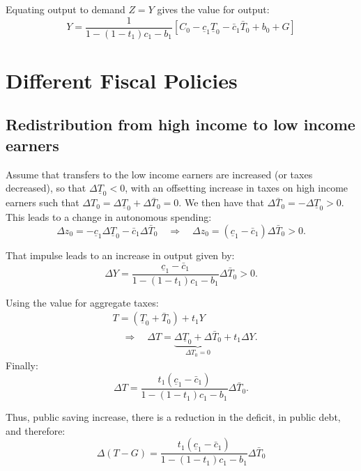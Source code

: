 \documentclass[]{book}
\theoremstyle{definition}
\theoremstyle{definition}
\theoremstyle{definition}
\theoremstyle{remark}
\begin{document}
Equating output to demand \(Z = Y\) gives the value for output:
\[\boxed{Y=\frac{1}{1-\left(1-t_{1}\right)c_{1}-b_{1}}\left[C_0-\underline{c}_{1}\underline{T}_{0}-\bar{c}_{1}\bar{T}_{0}+b_{0}+G\right]}\]

\section{Different Fiscal Policies}\label{different-fiscal-policies}

\subsection{Redistribution from high income to low income
earners}\label{redistribution-from-high-income-to-low-income-earners}

Assume that transfers to the low income earners are increased (or taxes
decreased), so that \(\Delta\underline{T}_{0}<0\), with an offsetting
increase in taxes on high income earners such that
\(\Delta T_0 = \Delta\underline{T}_{0}+\Delta\bar{T}_{0}=0\). We then
have that \(\Delta\bar{T}_{0}=-\Delta\underline{T}_{0}>0\). This leads
to a change in autonomous spending:
\[\Delta z_{0}=-\underline{c}_{1}\Delta\underline{T}_{0}-\bar{c}_{1}\Delta\bar{T}_{0}\quad\Rightarrow\quad\Delta z_{0}=\left(\underline{c}_{1}-\bar{c}_{1}\right)\Delta\bar{T}_{0}>0.\]

That impulse leads to an increase in output given by:
\[\Delta Y=\frac{\underline{c}_{1}-\bar{c}_{1}}{1-\left(1-t_{1}\right)c_{1}-b_{1}}\Delta\bar{T}_{0}>0.\]

Using the value for aggregate taxes: \[
\begin{aligned}
&T=\left(\underline{T}_{0}+\bar{T}_{0}\right)+t_1 Y\\
&\quad \Rightarrow \quad \Delta T=\underbrace{\Delta\underline{T}_{0}+\Delta\bar{T}_{0}}_{\Delta T_0 = 0}+t_1\Delta Y.
\end{aligned}
\] Finally:
\[\Delta T=\frac{t_1\left(\underline{c}_{1}-\bar{c}_{1}\right)}{1-\left(1-t_{1}\right)c_{1}-b_{1}}\Delta\bar{T}_{0}.\]

Thus, public saving increase, there is a reduction in the deficit, in
public debt, and therefore:
\[\Delta\left(T-G\right)=\frac{t_1\left(\underline{c}_{1}-\bar{c}_{1}\right)}{1-\left(1-t_{1}\right)c_{1}-b_{1}}\Delta\bar{T}_{0}\]
\end{document}
